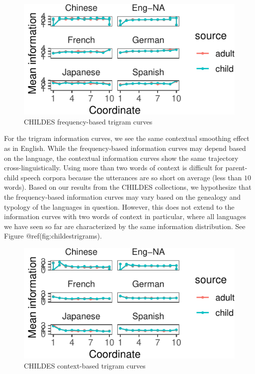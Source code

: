 \documentclass[10pt, letterpaper]{article}
\newenvironment{CodeChunk}{}{}
\begin{document}
\begin{CodeChunk}
\begin{figure}[tb]
\includegraphics{figs/childesunigrams-1} \caption[CHILDES frequency-based trigram curves]{CHILDES frequency-based trigram curves}\label{fig:childesunigrams}
\end{figure}
\end{CodeChunk}

For the trigram information curves, we see the same contextual smoothing
effect as in English. While the frequency-based information curves may
depend based on the language, the contextual information curves show the
same trajectory cross-linguistically. Using more than two words of
context is difficult for parent-child speech corpora because the
utterances are so short on average (less than \(10\) words). Based on
our results from the CHILDES collections, we hypothesize that the
frequency-based information curves may vary based on the genealogy and
typology of the languages in question. However, this does not extend to
the information curves with two words of context in particular, where
all languages we have seen so far are characterized by the same
information distribution. See Figure @ref(fig:childestrigrams).

\begin{CodeChunk}
\begin{figure}[tb]
\includegraphics{figs/childestrigrams-1} \caption[CHILDES context-based trigram curves]{CHILDES context-based trigram curves}\label{fig:childestrigrams}
\end{figure}
\end{CodeChunk}
\end{document}
